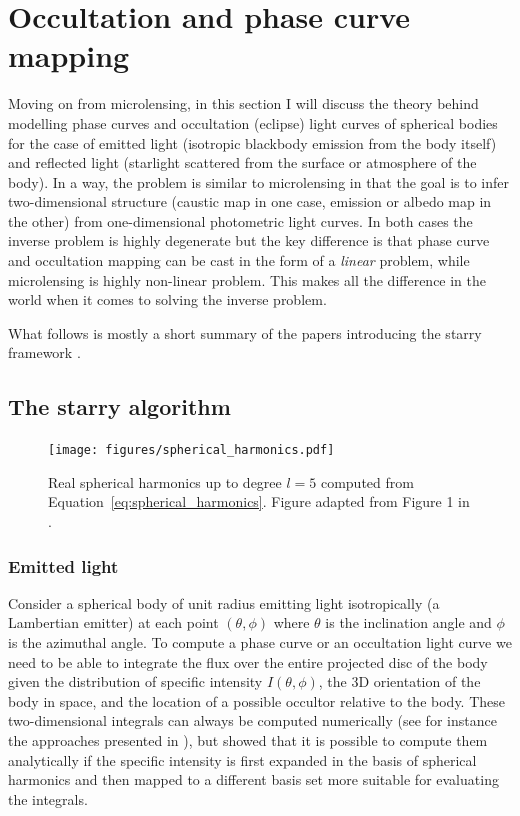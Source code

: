 \documentclass[12pt,dvipsnames]{report}
\newcommand{\ssf}[1]{\textsf{#1}}
\begin{document}
\section{Occultation and phase curve mapping}
\label{sec:occultations}
Moving on from microlensing, in this section I will discuss the theory behind modelling 
phase curves and occultation (eclipse) light curves of spherical bodies 
for the case of emitted light
(isotropic blackbody emission from the body itself) and reflected light
(starlight scattered from the surface or atmosphere of the body). 
In a way, the problem is similar to microlensing in that the goal is to infer 
two-dimensional structure (caustic map in one case, emission or albedo map in the other)
from one-dimensional photometric light curves. 
In both cases the inverse problem is highly degenerate but the key difference is that 
phase curve and occultation  mapping can be cast in the form of a 
\emph{linear} problem, while microlensing is highly non-linear problem. This makes all the 
difference in the world when it comes to solving the inverse problem.

What follows is mostly a short summary of the papers introducing the \ssf{starry} framework
\citep{2019AJ....157...64L,2021arXiv210306275L}.
\subsection{The starry algorithm}
\begin{figure}[t]
    \begin{centering}
        \texttt{[image: figures/spherical\_harmonics.pdf]}
        \caption{Real spherical harmonics up to degree $l=5$ computed from
            Equation~\ref{eq:spherical_harmonics}. Figure adapted from Figure 1 in
            \citet{2019AJ....157...64L}.}
        \label{fig:spherical_harmonics}
    \end{centering}
\end{figure}
\subsubsection{Emitted light}
Consider a spherical body of unit radius emitting light isotropically (a
Lambertian emitter) at each point $(\theta,\phi)$ where $\theta$ is the
inclination angle and $\phi$ is the azimuthal angle. To compute a phase curve
or an occultation light curve we need to be able to integrate the flux over the
entire projected disc of the body given the distribution of specific intensity
$I(\theta, \phi)$, the 3D orientation of the body in space, and the location of
a possible occultor relative to the body. These two-dimensional integrals can
always be computed numerically (see for instance the approaches presented in
\citet{2018AJ....156..146F,2018MNRAS.477.2613L}), but
\citet{2019AJ....157...64L} showed that it is possible to compute them
analytically if the specific intensity is first expanded in the basis of
spherical harmonics and then mapped to a different basis set more suitable for
evaluating the integrals.
\end{document}
